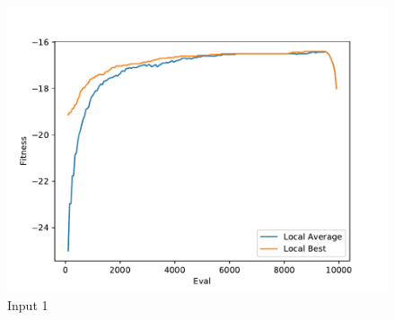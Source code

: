 \documentclass{standalone}
\begin{document}
\begin{figure}[!htb]
	\caption{Input 1}
	\label{fig:graph_1008}
	\includegraphics[width=\textwidth]{../graphs/graphs/1008.pdf}
\end{figure}
\end{document}
